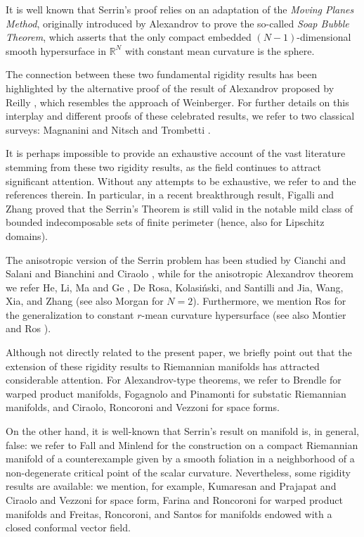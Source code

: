 \documentclass[10pt,a4paper]{amsart}
\numberwithin{equation}{section}
\begin{document}
It is well known that Serrin's proof relies on an adaptation of the \textit{Moving Planes Method}, originally introduced by Alexandrov \cite{a58,a62} to prove the so-called {\it Soap Bubble Theorem}, which asserts that the only compact embedded $(N-1)$-dimensional smooth hypersurface in $\mathbb{R}^N$ with constant mean curvature is the sphere.

The connection between these two fundamental rigidity results has been highlighted by the alternative proof of the result of Alexandrov proposed by Reilly \cite{re77,re82}, which resembles the approach of Weinberger. For further details on this interplay and different proofs of these celebrated results, we refer to two classical surveys: Magnanini \cite{ma2017} and Nitsch and Trombetti \cite{nt}.

It is perhaps impossible to provide an exhaustive account of the vast literature stemming from these two rigidity results, as the field continues to attract significant attention. 
Without any attempts to be exhaustive, we refer to \cite{agbomaz2025, bc, bnst, bh, cgs, cs, dep23, fj, fk, fv, f, fgk, gnn, hp, p,ro} and the references therein. In particular, in a recent breakthrough result,  Figalli and Zhang \cite{fz2025} proved that the Serrin’s Theorem is still valid in the notable mild class of bounded indecomposable sets of finite perimeter (hence, also for Lipschitz domains).

The anisotropic version of the Serrin problem has been studied by Cianchi and Salani \cite{cs} and Bianchini and Ciraolo \cite{bc}, while for the anisotropic Alexandrov theorem we refer He, Li, Ma and Ge \cite{hlmg2009}, De Rosa, Kolasi\'nski, and Santilli \cite{dks2020} and Jia, Wang, Xia, and Zhang \cite{jwxz2023} (see also Morgan \cite{m2005} for $N=2$). 
Furthermore, we mention Ros \cite{ro} for the generalization to constant $r$-mean curvature hypersurface (see also Montier and Ros \cite{mr1991}). 

Although not directly related to the present paper, we briefly point out that the extension of these rigidity results to Riemannian manifolds has attracted considerable attention. For Alexandrov-type theorems, we refer to Brendle \cite{b2013} for warped product manifolds, Fogagnolo and Pinamonti \cite{fp2022} for substatic Riemannian manifolds, and Ciraolo, Roncoroni and Vezzoni \cite{crv2021} for space forms. 

On the other hand, it is well-known that Serrin's result on manifold is, in general, false: we refer to Fall and Minlend \cite{fm2015} for the construction on a compact Riemannian manifold of a counterexample given by a smooth foliation in a neighborhood of a non-degenerate critical point of the scalar curvature. Nevertheless, some rigidity results are available: we mention, for example, Kumaresan and Prajapat \cite{kp98} and Ciraolo and Vezzoni \cite{cv2019} for space form, Farina and Roncoroni \cite{fr} for warped product manifolds and Freitas, Roncoroni, and Santos \cite{frs2024} for manifolds endowed with a closed conformal vector field.
\end{document}
